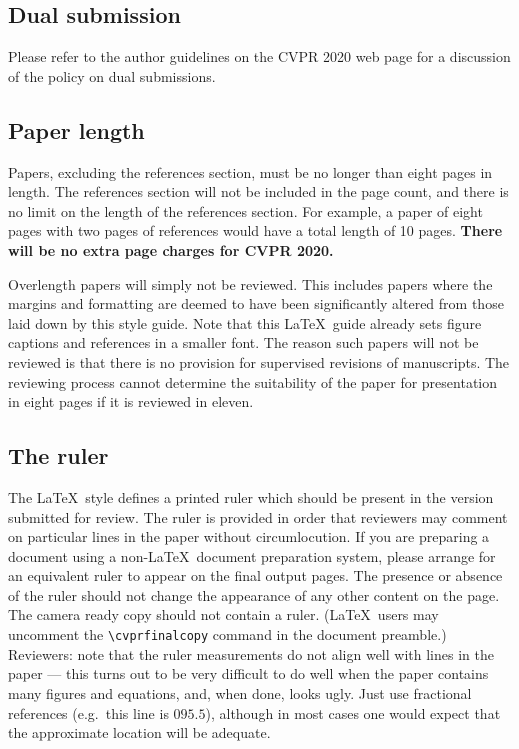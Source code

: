 \documentclass[10pt,twocolumn,letterpaper]{article}
\begin{document}
\begin{CJK}{UTF8}{bkai}
   \subsection{Dual submission}

   Please refer to the author guidelines on the CVPR 2020 web page for a
   discussion of the policy on dual submissions.~\cite{Alpher04}

   \subsection{Paper length}
   Papers, excluding the references section,
   must be no longer than eight pages in length. The references section
   will not be included in the page count, and there is no limit on the
   length of the references section. For example, a paper of eight pages
   with two pages of references would have a total length of 10 pages.
      {\bf There will be no extra page charges for CVPR 2020.}

   Overlength papers will simply not be reviewed.  This includes papers
   where the margins and formatting are deemed to have been significantly
   altered from those laid down by this style guide.  Note that this
   \LaTeX\ guide already sets figure captions and references in a smaller font.
   The reason such papers will not be reviewed is that there is no provision for
   supervised revisions of manuscripts.  The reviewing process cannot determine
   the suitability of the paper for presentation in eight pages if it is
   reviewed in eleven.

   \subsection{The ruler}
   The \LaTeX\ style defines a printed ruler which should be present in the
   version submitted for review.  The ruler is provided in order that
   reviewers may comment on particular lines in the paper without
   circumlocution.  If you are preparing a document using a non-\LaTeX\
   document preparation system, please arrange for an equivalent ruler to
   appear on the final output pages.  The presence or absence of the ruler
   should not change the appearance of any other content on the page.  The
   camera ready copy should not contain a ruler. (\LaTeX\ users may uncomment
   the \verb'\cvprfinalcopy' command in the document preamble.)  Reviewers:
   note that the ruler measurements do not align well with lines in the paper
   --- this turns out to be very difficult to do well when the paper contains
   many figures and equations, and, when done, looks ugly.  Just use fractional
   references (e.g.\ this line is $095.5$), although in most cases one would
   expect that the approximate location will be adequate.


\end{CJK}
\end{document}
